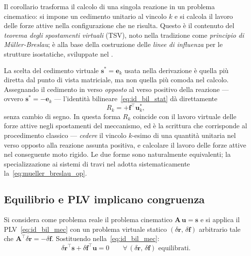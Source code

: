 \begin{oss}
	Il corollario trasforma il calcolo di una singola
	reazione in un problema cinematico: si impone un
	cedimento unitario al vincolo $k$ e si calcola il
	lavoro delle forze attive nella configurazione che
	ne risulta. Questo è il contenuto del \emph{teorema
		degli spostamenti virtuali} (TSV), noto nella
	tradizione come \emph{principio di Müller-Breslau};
	è alla base della costruzione delle \emph{linee di
		influenza} per le strutture isostatiche, sviluppate
	nel .
\end{oss}

\begin{oss}
	\label{oss:TSV_operativa}
	La scelta del cedimento virtuale $\bm{s}^* = \bm{e}_k$
	usata nella derivazione è quella più diretta dal punto
	di vista matriciale, ma non quella più comoda nel
	calcolo. Assegnando il cedimento in verso \emph{opposto}
	al verso positivo della reazione --- ovvero $\bm{s}^* =
	-\bm{e}_k$ --- l'identità bilineare~\eqref{eq:id_bil_stat}
	dà direttamente
	\begin{equation}\label{eq:mueller_breslau_op}
		R_k = +\bm{f}^{\top}\bm{u}^*_k,
	\end{equation}
	senza cambio di segno. In questa forma $R_k$ coincide
	con il lavoro virtuale delle forze attive negli
	spostamenti del meccanismo, ed è la scrittura che
	corrisponde al procedimento classico --- \emph{cedere}
	il vincolo $k$-esimo di una quantità unitaria nel verso
	opposto alla reazione assunta positiva, e calcolare il
	lavoro delle forze attive nel conseguente moto rigido.
	Le due forme sono naturalmente equivalenti; la
	specializzazione ai sistemi di travi nel
	 adotta sistematicamente
	la~\eqref{eq:mueller_breslau_op}.
\end{oss}




\subsection{Equilibrio e PLV implicano congruenza}
\label{sec:eq_PLV}

Si considera come problema reale il problema cinematico
$\bm{A}\,\bm{u} = \bm{s}$ e si applica il
PLV~\eqref{eq:id_bil_mec} con un problema virtuale
statico $(\delta\bm{r},\,\delta\bm{f})$ arbitrario
tale che $\bm{A}^{\top}\delta\bm{r} = -\delta\bm{f}$.
Sostituendo nella~\eqref{eq:id_bil_mec}:
\begin{equation}\label{eq:id_bil_cin}
	\delta\bm{r}^{\top}\bm{s} +
	\delta\bm{f}^{\top}\bm{u} = 0
	\qquad
	\forall\,(\delta\bm{r},\,\delta\bm{f})
	\text{ equilibrati}.
\end{equation}

